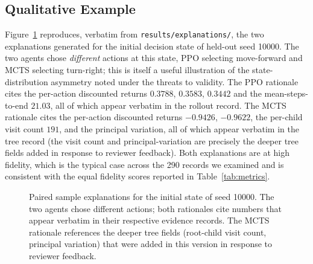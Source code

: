 \documentclass[conference]{IEEEtran}
\begin{document}
\subsection{Qualitative Example}
\label{sec:qualitative}
Figure~\ref{fig:qualex} reproduces, verbatim from
\texttt{results/explanations/}, the two explanations generated for
the initial decision state of held-out seed 10000. The two agents
chose \emph{different} actions at this state, PPO selecting
move-forward and MCTS selecting turn-right; this is itself a
useful illustration of the state-distribution asymmetry noted under
the threats to validity. The PPO rationale cites the per-action
discounted returns $0.3788$, $0.3583$, $0.3442$ and the
mean-steps-to-end $21.03$, all of which appear verbatim in the
rollout record. The MCTS rationale cites the per-action discounted
returns $-0.9426$, $-0.9622$, the per-child visit count $191$, and
the principal variation, all of which appear verbatim in the tree
record (the visit count and principal-variation are precisely the
deeper tree fields added in response to reviewer feedback). Both
explanations are at high fidelity, which is the typical case across
the 290 records we examined and is consistent with the equal
fidelity scores reported in Table~\ref{tab:metrics}.

\begin{figure}[t]
\centering
{}
\caption{Paired sample explanations for the initial state of seed
10000. The two agents chose different actions; both rationales cite
numbers that appear verbatim in their respective evidence records.
The MCTS rationale references the deeper tree fields (root-child
visit count, principal variation) that were added in this version
in response to reviewer feedback.}
\label{fig:qualex}
\end{figure}
\end{document}
